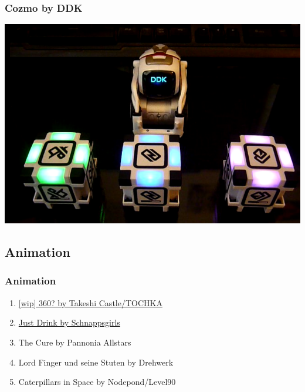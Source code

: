 \documentclass{beamer}
\begin{document}
\begin{frame}
  \frametitle{Cozmo by DDK}
  \includegraphics[width=\textwidth]{cozmo_screen}
\end{frame}

\subsection{Animation}
\begin{frame}
  \frametitle{Animation}
  \begin{enumerate}
  \item \href{https://demozoo.org/productions/191974/}{[wip] 360? by Takeshi Castle/TOCHKA}
  \item \href{https://demozoo.org/productions/191975/}{Just Drink by Schnappsgirls}
  \item The Cure by Pannonia Allstars
  \item Lord Finger und seine Stuten by Drehwerk
  \item Caterpillars in Space by Nodepond/Level90
  \end{enumerate}
\end{frame}
\end{document}
